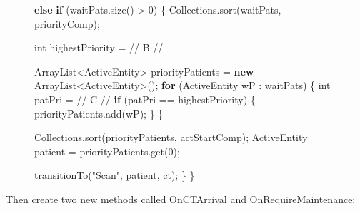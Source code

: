 \documentclass[
  10pt,
  a4paperpaper,
  DIV=11,
  numbers=noendperiod,
  oneside]{scrreprt}
\newenvironment{Shaded}{\begin{snugshade}}{\end{snugshade}}
\newcommand{\BuiltInTok}[1]{\textcolor[rgb]{0.00,0.23,0.31}{#1}}
\newcommand{\CommentTok}[1]{\textcolor[rgb]{0.37,0.37,0.37}{#1}}
\newcommand{\ControlFlowTok}[1]{\textcolor[rgb]{0.00,0.23,0.31}{\textbf{#1}}}
\newcommand{\DataTypeTok}[1]{\textcolor[rgb]{0.68,0.00,0.00}{#1}}
\newcommand{\DecValTok}[1]{\textcolor[rgb]{0.68,0.00,0.00}{#1}}
\newcommand{\FunctionTok}[1]{\textcolor[rgb]{0.28,0.35,0.67}{#1}}
\newcommand{\KeywordTok}[1]{\textcolor[rgb]{0.00,0.23,0.31}{\textbf{#1}}}
\newcommand{\NormalTok}[1]{\textcolor[rgb]{0.00,0.23,0.31}{#1}}
\newcommand{\OperatorTok}[1]{\textcolor[rgb]{0.37,0.37,0.37}{#1}}
\newcommand{\StringTok}[1]{\textcolor[rgb]{0.13,0.47,0.30}{#1}}
\begin{document}
\begin{figure}
\begin{codebox}
\begin{Shaded}
\begin{Highlighting}[numbers=left,,]
  \ControlFlowTok{else} \ControlFlowTok{if} \OperatorTok{(}\NormalTok{waitPats}\OperatorTok{.}\FunctionTok{size}\OperatorTok{()} \OperatorTok{\textgreater{}} \DecValTok{0}\OperatorTok{)} \OperatorTok{\{}
    \BuiltInTok{Collections}\OperatorTok{.}\FunctionTok{sort}\OperatorTok{(}\NormalTok{waitPats}\OperatorTok{,}\NormalTok{ priorityComp}\OperatorTok{);}
    
    \DataTypeTok{int}\NormalTok{ highestPriority }\OperatorTok{=} \CommentTok{// B //}
    
    \BuiltInTok{ArrayList}\OperatorTok{\textless{}}\NormalTok{ActiveEntity}\OperatorTok{\textgreater{}}\NormalTok{ priorityPatients }\OperatorTok{=} \KeywordTok{new} \BuiltInTok{ArrayList}\OperatorTok{\textless{}}\NormalTok{ActiveEntity}\OperatorTok{\textgreater{}();}
    \ControlFlowTok{for} \OperatorTok{(}\NormalTok{ActiveEntity wP }\OperatorTok{:}\NormalTok{ waitPats}\OperatorTok{)} \OperatorTok{\{}
      \DataTypeTok{int}\NormalTok{ patPri }\OperatorTok{=} \CommentTok{// C //}
      \ControlFlowTok{if} \OperatorTok{(}\NormalTok{patPri }\OperatorTok{==}\NormalTok{ highestPriority}\OperatorTok{)} \OperatorTok{\{}
\NormalTok{        priorityPatients}\OperatorTok{.}\FunctionTok{add}\OperatorTok{(}\NormalTok{wP}\OperatorTok{);}
      \OperatorTok{\}}
    \OperatorTok{\}}
    
    \BuiltInTok{Collections}\OperatorTok{.}\FunctionTok{sort}\OperatorTok{(}\NormalTok{priorityPatients}\OperatorTok{,}\NormalTok{ actStartComp}\OperatorTok{);}
\NormalTok{    ActiveEntity patient }\OperatorTok{=}\NormalTok{ priorityPatients}\OperatorTok{.}\FunctionTok{get}\OperatorTok{(}\DecValTok{0}\OperatorTok{);}
              
    \FunctionTok{transitionTo}\OperatorTok{(}\StringTok{"Scan"}\OperatorTok{,}\NormalTok{ patient}\OperatorTok{,}\NormalTok{ ct}\OperatorTok{);}
  \OperatorTok{\}}
\OperatorTok{\}}
\end{Highlighting}
\end{Shaded}

\end{codebox}

\end{figure}%

\newpage{}

Then create two new methods called OnCTArrival and OnRequireMaintenance:
\end{document}
